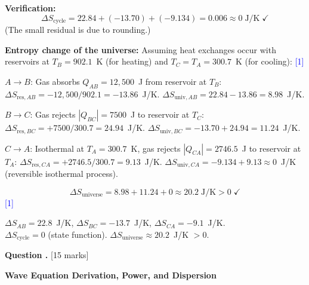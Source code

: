 \documentclass[12pt,a4paper]{article}
\newcounter{questioncounter}
\newcommand{\question}[1]{%
  \stepcounter{questioncounter}%
  \vspace{0.5cm}%
  \noindent\textbf{Question \thequestioncounter.} \hfill [#1 marks]%
  \vspace{0.2cm}%
  \par%
}
\newcommand{\markstep}[1]{\hfill\textcolor{blue}{[#1]}}
\newcommand{\finalanswer}[1]{%
  \begin{tcolorbox}[colback=green!5!white,colframe=green!50!black,boxrule=0.5pt]
  #1
  \end{tcolorbox}
}
\begin{document}
\begin{parts}
\textbf{Verification:}
\[
\Delta S_{\text{cycle}} = 22.84 + (-13.70) + (-9.134) = 0.006 \approx 0\;\text{J/K} \;\checkmark
\]
(The small residual is due to rounding.)

\textbf{Entropy change of the universe:} Assuming heat exchanges occur with reservoirs at $T_B = 902.1$~K (for heating) and $T_C = T_A = 300.7$~K (for cooling): \markstep{1}

$A\to B$: Gas absorbs $Q_{AB} = 12{,}500$~J from reservoir at $T_B$:
$\Delta S_{\text{res},AB} = -12{,}500/902.1 = -13.86$~J/K.
$\Delta S_{\text{univ},AB} = 22.84 - 13.86 = 8.98$~J/K.

$B\to C$: Gas rejects $|Q_{BC}| = 7500$~J to reservoir at $T_C$:
$\Delta S_{\text{res},BC} = +7500/300.7 = 24.94$~J/K.
$\Delta S_{\text{univ},BC} = -13.70 + 24.94 = 11.24$~J/K.

$C\to A$: Isothermal at $T_A = 300.7$~K, gas rejects $|Q_{CA}| = 2746.5$~J to reservoir at $T_A$:
$\Delta S_{\text{res},CA} = +2746.5/300.7 = 9.13$~J/K.
$\Delta S_{\text{univ},CA} = -9.134 + 9.13 \approx 0$~J/K (reversible isothermal process).

\[
\Delta S_{\text{universe}} = 8.98 + 11.24 + 0 \approx 20.2\;\text{J/K} > 0 \;\checkmark
\]
\markstep{1}

\finalanswer{$\Delta S_{AB} = 22.8$~J/K, $\Delta S_{BC} = -13.7$~J/K, $\Delta S_{CA} = -9.1$~J/K.\\
$\Delta S_{\text{cycle}} = 0$ (state function). $\Delta S_{\text{universe}} \approx 20.2$~J/K $> 0$.}
\end{parts}

\newpage

\question{15}

\noindent\textbf{Wave Equation Derivation, Power, and Dispersion}
\end{document}
